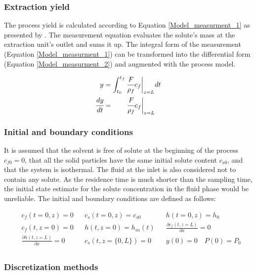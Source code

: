 \documentclass[../Article_Model_Parameters.tex]{subfiles}
\begin{document}
			\subsubsection{Extraction yield} \label{CH: Yield}
			
			The process yield is calculated according to Equation \ref{Model_measurment_1} as presented by \citet{Sovova1994a}. The measurement equation evaluates the solute's mass at the extraction unit's outlet and sums it up. The integral form of the measurement (Equation \ref{Model_measurment_1}) can be transformed into the differential form (Equation \ref{Model_measurment_2}) and augmented with the process model.
			
			{\footnotesize
				\begin{align} 
					\label{Model_measurment_1}
					y &= \int_{t_0}^{t_f} \cfrac{F}{\rho_f} c_f \biggr\rvert_{z=L} dt \\
					\cfrac{dy}{dt} &= \qquad \cfrac{F}{\rho_f} c_f \biggr\rvert_{z=L} 
					\label{Model_measurment_2}
			\end{align}	}
			
			\subsubsection{Initial and boundary conditions} 
			It is assumed that the solvent is free of solute at the beginning of the process $c_{f0}=0$, that all the solid particles have the same initial solute content $c_{s0}$, and that the system is isothermal. The fluid at the inlet is also considered not to contain any solute. As the residence time is much shorter than the sampling time, the initial state estimate for the solute concentration in the fluid phase would be unreliable. The initial and boundary conditions are defined as follows:
			
			{\footnotesize
				\begin{align*}
					&c_f(t = 0, z) = 0  && c_s(t = 0, z) = c_{s0} && h(t = 0, z) = h_0 \\
					&c_f(t,   z=0) = 0  && h(t, z=0) = h_{in}(t)  && \frac{\partial c_f(t,z=L)}{\partial x} = 0 \\
					&\frac{\partial h(t,z=L)}{\partial x} = 0   && c_s(t, z=\{0,L\}) = 0 && y(0) = 0 \quad P(0) = P_0 \\
			\end{align*} }
			
			\subsubsection{Discretization methods}
			
\end{document}

